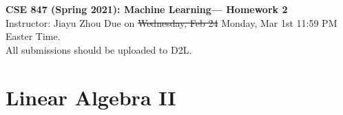 \documentclass[11pt]{article}
\begin{document}
\thispagestyle {empty}

\newcommand{\lsp}[1]{\large\renewcommand{\baselinestretch}{#1}\normalsize}
\newcommand{\hsp}{\hspace{.2in}}
\newcommand{\comment}[1]{}
\newtheorem{thm}{Theorem}[section]
\newtheorem{lem}{Lemma}[section]
\newtheorem{cor}{Corollary}[section]
\newtheorem{prop}{Proposition}[section]
\newtheorem{problem}{Problem}[section]

\newcommand{\R}{{\rm\hbox{I\kern-.15em R}}}
\newcommand{\IR}{{\rm\hbox{I\kern-.15em R}}}
\newcommand{\IN}{{\rm\hbox{I\kern-.15em N}}}
\newcommand{\IZ}{{\sf\hbox{Z\kern-.40em Z}}}
\newcommand{\IS}{{\rm\hbox{S\kern-.45em S}}}
\newcommand{\Real}{I\!\!R}

\newcommand{\bPhi}{\bm{\Phi}}
\newcommand{\bphi}{\bm{\phi}}
\newcommand{\bw}{\mathbf{w}}
\newcommand{\bt}{\mathbf{t}}
\newcommand{\bx}{\mathbf{x}}
\newcommand{\by}{\mathbf{y}}
\newcommand{\bX}{\mathbf{X}}
\newcommand{\bmm}{\mathbf{m}}
\newcommand{\bS}{\mathbf{S}}

\newcommand{\linesep}{\vspace{.2cm}\hrule\vspace{0.2cm}}
\newcommand{\categorysep}{\vspace{0.5cm}}
\newcommand{\entrysep}{\vspace{0cm}}

\newcommand{\category}[1]{\categorysep
                  \noindent {\bf \large #1}
              \linesep}

\pagestyle{empty}

\begin{center}
{\large \textbf{CSE 847 (Spring 2021): Machine Learning--- Homework 2}} \\
 Instructor: Jiayu Zhou \quad
 Due on {\color{red}\sout{Wednesday, Feb 24} Monday, Mar 1st} 11:59 PM Easter Time. \\
 All submissions should be uploaded to D2L.
\end{center}

\section{Linear Algebra II}
\end{document}
